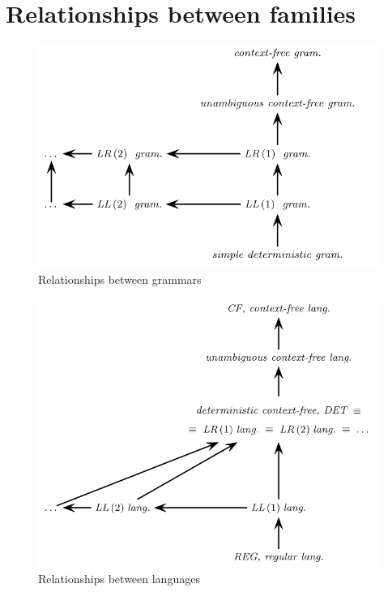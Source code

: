 \section{Relationships between families}

\begin{figure}[H]
    \centering
    \includegraphics[width=0.9\linewidth]{parsing/relationships-grammars.png}
    \caption*{Relationships between grammars}
\end{figure}

\begin{figure}[H]
    \centering
    \includegraphics[width=0.9\linewidth]{parsing/relationships-languages.png}
    \caption*{Relationships between languages}
\end{figure}
